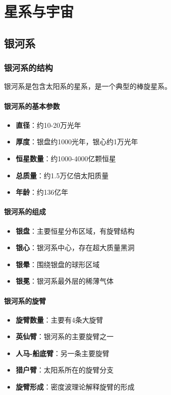 \documentclass[12pt,UTF8]{ctexbook}
\begin{document}
\part{星系与宇宙}

\chapter{银河系}
\section{银河系的结构}

银河系是包含太阳系的星系，是一个典型的棒旋星系。

\subsection{银河系的基本参数}

\begin{itemize}
  \item \textbf{直径}：约10-20万光年
  \item \textbf{厚度}：银盘约1000光年，银心约1万光年
  \item \textbf{恒星数量}：约1000-4000亿颗恒星
  \item \textbf{总质量}：约1.5万亿倍太阳质量
  \item \textbf{年龄}：约136亿年
\end{itemize}

\subsection{银河系的组成}

\begin{itemize}
  \item \textbf{银盘}：主要恒星分布区域，有旋臂结构
  \item \textbf{银心}：银河系中心，存在超大质量黑洞
  \item \textbf{银晕}：围绕银盘的球形区域
  \item \textbf{银冕}：银河系最外层的稀薄气体
\end{itemize}

\subsection{银河系的旋臂}

\begin{itemize}
  \item \textbf{旋臂数量}：主要有4条大旋臂
  \item \textbf{英仙臂}：银河系的主要旋臂之一
  \item \textbf{人马-船底臂}：另一条主要旋臂
  \item \textbf{猎户臂}：太阳系所在的旋臂分支
  \item \textbf{旋臂形成}：密度波理论解释旋臂的形成
\end{itemize}
\end{document}
